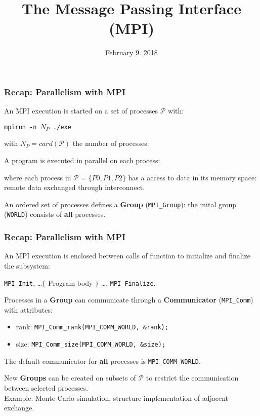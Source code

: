 

\title{The Message Passing Interface (MPI)}
\date{February 9. 2018}

\maketitle


\begin{frame}
  \frametitle{Recap: Parallelism with MPI}

An MPI execution is started on a set of processes $\mathcal{P}$ with:
\begin{center}
\texttt{mpirun -n $N_P$ ./exe}
\end{center}
with $\texttt{$N_P$} = card(\mathcal{P})$ the number of processes.

\bigskip
A program is executed in parallel on each process:
\begin{center}
    \scalebox{0.8}{}
\end{center}
where each process in $\mathcal{P} = \lbrace P0, P1, P2 \rbrace$ has a access to data in its memory space: remote data exchanged through interconnect.

\medskip
An ordered set of processes defines a \textbf{Group} (\texttt{MPI\_Group}): the inital group (\texttt{WORLD}) consists of \textbf{all} processes.

\end{frame}

\begin{frame}
  \frametitle{Recap: Parallelism with MPI}

An MPI execution is enclosed between calls of function to initialize and finalize the subsystem:
\begin{center}
\texttt{MPI\_Init}, \dots $\lbrace$ Program body $\rbrace$ \dots, \texttt{MPI\_Finalize}.
\end{center}
\bigskip

Processes in a \textbf{Group} can communicate through a \textbf{Communicator} (\texttt{MPI\_Comm}) with attributes:
\begin{itemize}
\item rank: \texttt{MPI\_Comm\_rank(MPI\_COMM\_WORLD, \&rank);}
\item size: \texttt{MPI\_Comm\_size(MPI\_COMM\_WORLD, \&size);}
\end{itemize}

\bigskip
The default communicator for \textbf{all} processes is \texttt{MPI\_COMM\_WORLD}.

\bigskip
New \textbf{Groups} can be created on subsets of $\mathcal{P}$ to restrict the communication between selected processes.\\[2ex]
Example: Monte-Carlo simulation, structure implementation of adjacent exchange. 

\end{frame}


